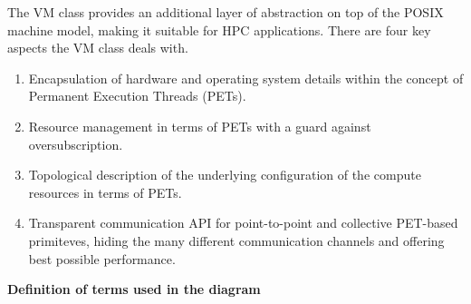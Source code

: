 

The VM class provides an additional layer of abstraction on top of the POSIX machine model, making it suitable for HPC applications. There are four key aspects the VM class deals with.

\begin{enumerate}

\item Encapsulation of hardware and operating system details within the concept of Permanent Execution Threads (PETs).

\item Resource management in terms of PETs with a guard against oversubscription.

\item Topological description of the underlying configuration of the compute resources in terms of PETs.

\item Transparent communication API for point-to-point and collective PET-based primiteves, hiding the many different communication channels and offering best possible performance.

\end{enumerate}



{\bf Definition of terms used in the diagram}


